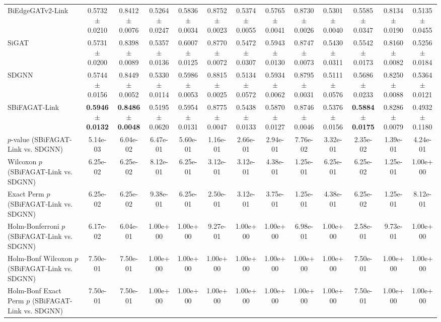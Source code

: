 \begin{table}[t]
{\begin{tabular}{lcccccccccccc}
BiEdgeGATv2-Link & 0.5732 $\pm$ 0.0210 & 0.8412 $\pm$ 0.0076 & 0.5264 $\pm$ 0.0247 & 0.5836 $\pm$ 0.0034 & 0.8752 $\pm$ 0.0023 & 0.5374 $\pm$ 0.0055 & 0.5765 $\pm$ 0.0041 & 0.8730 $\pm$ 0.0026 & 0.5301 $\pm$ 0.0040 & 0.5585 $\pm$ 0.0347 & 0.8134 $\pm$ 0.0190 & 0.5135 $\pm$ 0.0455 \\
SiGAT & 0.5731 $\pm$ 0.0200 & 0.8398 $\pm$ 0.0089 & 0.5357 $\pm$ 0.0136 & 0.6007 $\pm$ 0.0125 & 0.8770 $\pm$ 0.0072 & 0.5472 $\pm$ 0.0307 & 0.5943 $\pm$ 0.0130 & 0.8747 $\pm$ 0.0073 & 0.5430 $\pm$ 0.0311 & 0.5542 $\pm$ 0.0173 & 0.8160 $\pm$ 0.0082 & 0.5256 $\pm$ 0.0184 \\
SDGNN & 0.5744 $\pm$ 0.0156 & 0.8449 $\pm$ 0.0052 & 0.5330 $\pm$ 0.0114 & 0.5986 $\pm$ 0.0053 & 0.8815 $\pm$ 0.0025 & 0.5134 $\pm$ 0.0572 & 0.5934 $\pm$ 0.0062 & 0.8795 $\pm$ 0.0031 & 0.5111 $\pm$ 0.0576 & 0.5686 $\pm$ 0.0233 & 0.8250 $\pm$ 0.0088 & 0.5364 $\pm$ 0.0121 \\
SBiFAGAT-Link & \textbf{0.5946 $\pm$ 0.0132} & \textbf{0.8486 $\pm$ 0.0048} & 0.5195 $\pm$ 0.0620 & 0.5954 $\pm$ 0.0131 & 0.8775 $\pm$ 0.0047 & 0.5438 $\pm$ 0.0133 & 0.5870 $\pm$ 0.0127 & 0.8746 $\pm$ 0.0046 & 0.5376 $\pm$ 0.0156 & \textbf{0.5884 $\pm$ 0.0175} & 0.8286 $\pm$ 0.0079 & 0.4932 $\pm$ 0.1180 \\
\midrule
$p$-value (SBiFAGAT-Link vs. SDGNN) & 5.14e-03 & 6.04e-02 & 6.47e-01 & 5.60e-01 & 1.16e-01 & 2.66e-01 & 2.94e-01 & 7.76e-02 & 3.32e-01 & 2.35e-02 & 1.39e-01 & 4.24e-01 \\
Wilcoxon $p$ (SBiFAGAT-Link vs. SDGNN) & 6.25e-02 & 6.25e-02 & 8.12e-01 & 6.25e-01 & 3.12e-01 & 3.12e-01 & 4.38e-01 & 1.25e-01 & 6.25e-01 & 6.25e-02 & 1.25e-01 & 1.00e+00 \\
Exact Perm $p$ (SBiFAGAT-Link vs. SDGNN) & 6.25e-02 & 6.25e-02 & 9.38e-01 & 6.25e-01 & 2.50e-01 & 3.12e-01 & 3.75e-01 & 1.25e-01 & 4.38e-01 & 6.25e-02 & 1.25e-01 & 8.12e-01 \\
Holm-Bonferroni $p$ (SBiFAGAT-Link vs. SDGNN) & 6.17e-02 & 6.04e-01 & 1.00e+00 & 1.00e+00 & 9.27e-01 & 1.00e+00 & 1.00e+00 & 6.98e-01 & 1.00e+00 & 2.58e-01 & 9.73e-01 & 1.00e+00 \\
Holm-Bonf Wilcoxon $p$ (SBiFAGAT-Link vs. SDGNN) & 7.50e-01 & 7.50e-01 & 1.00e+00 & 1.00e+00 & 1.00e+00 & 1.00e+00 & 1.00e+00 & 1.00e+00 & 1.00e+00 & 7.50e-01 & 1.00e+00 & 1.00e+00 \\
Holm-Bonf Exact Perm $p$ (SBiFAGAT-Link vs. SDGNN) & 7.50e-01 & 7.50e-01 & 1.00e+00 & 1.00e+00 & 1.00e+00 & 1.00e+00 & 1.00e+00 & 1.00e+00 & 1.00e+00 & 7.50e-01 & 1.00e+00 & 1.00e+00 \\
\bottomrule
\end{tabular}
}
\end{table}
